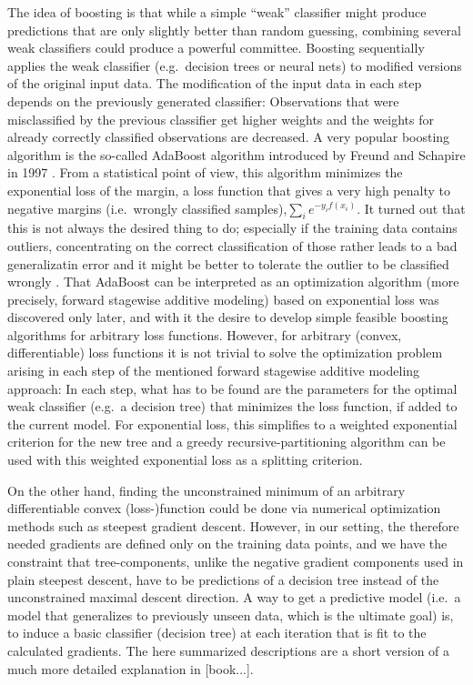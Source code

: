 The idea of boosting is that while a simple ``weak'' classifier might produce predictions that are only slightly better than random guessing, combining several weak classifiers could produce a powerful committee. 
Boosting sequentially applies the weak classifier (e.g.\ decision trees or neural nets) to modified versions of the original input data. 
The modification of the input data in each step depends on the previously generated classifier: Observations that were misclassified by the previous classifier get higher weights and the weights for already correctly classified observations are decreased. 
A very popular boosting algorithm is the so-called AdaBoost algorithm introduced by Freund and Schapire in 1997 . 
From a statistical point of view, this algorithm minimizes the exponential loss of the margin, a loss function that gives a very high penalty to negative margins (i.e.\ wrongly classified samples),$\sum_i e^{-y_i f(x_i)}$. 
It turned out that this is not always the desired thing to do; especially if the training data contains outliers, concentrating on the correct classification of those rather leads to a bad generalizatin error and it might be better to tolerate the outlier to be classified wrongly . 
That AdaBoost can be interpreted as an optimization algorithm (more precisely, forward stagewise additive modeling) based on exponential loss was discovered only later, and with it the desire to develop simple feasible boosting algorithms for arbitrary loss functions. 
However, for arbitrary (convex, differentiable) loss functions it is not trivial to solve the optimization problem arising in each step of the mentioned forward stagewise additive modeling approach: 
In each step, what has to be found are the parameters for the optimal weak classifier (e.g.\ a decision tree) that minimizes the loss function, if added to the current model. 
For exponential loss, this simplifies to a weighted exponential criterion for the new tree and a greedy recursive-partitioning algorithm can be used with this weighted exponential loss as a splitting criterion. 

On the other hand, finding the unconstrained minimum of an arbitrary differentiable convex (loss-)function could be done via numerical optimization methods such as steepest gradient descent. 
However, in our setting, the therefore needed gradients are defined only on the training data points, and we have the constraint that tree-components, unlike the negative gradient components used in plain steepest descent, have to be predictions of a decision tree instead of the unconstrained maximal descent direction. 
A way to get a predictive model (i.e.\ a model that generalizes to previously unseen data, which is the ultimate goal) is, to induce a basic classifier (decision tree) at each iteration that is fit to the calculated gradients. 
The here summarized descriptions are a short version of a much more detailed explanation in [book...].

